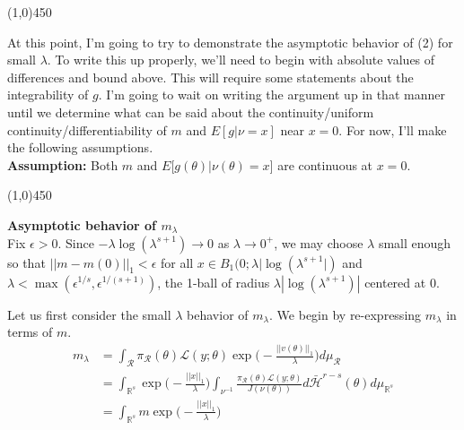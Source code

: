 \documentclass[10pt,fleqn]{article}
\DeclareMathOperator{\1}{\mathbbm{1}}
\begin{document}
{\begin{center}\line(1,0){450}\end{center}

At this point, I'm going to try to demonstrate the asymptotic behavior of (2) for small $\lambda.$ To write this up properly, we'll need to begin with absolute values of differences and bound above. This will require some statements about the integrability of $g$. I'm going to wait on writing the argument up in that manner until we determine what can be said about the continuity/uniform continuity/differentiability of $m$ and $E[g|\nu=x]$ near $x=0.$ For now, I'll make the following assumptions.\\

\noindent\textbf{Assumption:} Both $m$ and $E\big[g(\theta)|\nu(\theta)=x\big]$ are continuous at $x=0.$

\begin{center}\line(1,0){450}\end{center}
\vspace{0.5cm}
\noindent \textbf{Asymptotic behavior of $m_\lambda$} \\

\noindent Fix $\epsilon >0$. Since $-\lambda\log(\lambda^{s+1}) \to 0$ as $\lambda\to 0^+$, we may choose $\lambda$ small enough so that $||m-m(0)||_1 < \epsilon$ for all $x\in B_1(0;\lambda|\log(\lambda^{s+1}|)$ and $\lambda < \max(\epsilon^{1/s},\epsilon^{1/(s+1)})$, the 1-ball of radius $\lambda|\log(\lambda^{s+1})|$ centered at $0.$ 

Let us first consider the small $\lambda$ behavior of $m_\lambda.$ We begin by re-expressing $m_\lambda$ in terms of $m.$
\begin{align*}
m_\lambda &= \int_\mathcal{R} \pi_\mathcal{R}(\theta) \mathcal{L}(y;\theta) \exp\bigg(-\frac{||v(\theta)||_1}{\lambda}\bigg) d\mu_\mathcal{R} \\
&= \int_{\mathbb{R}^s} \exp\bigg(-\frac{||x||_1}{\lambda}\bigg) \int_{\nu^{-1}} \frac{\pi_\mathcal{R}(\theta) \mathcal{L}(y;\theta)}{J(\nu(\theta))} d\bar{\mathcal{H}}^{r-s}(\theta) d\mu_{\mathbb{R}^s}  \\
&=\int_{\mathbb{R}^s}m \exp\bigg(-\frac{||x||_1}{\lambda}\bigg)
\end{align*}

}
\end{document}
